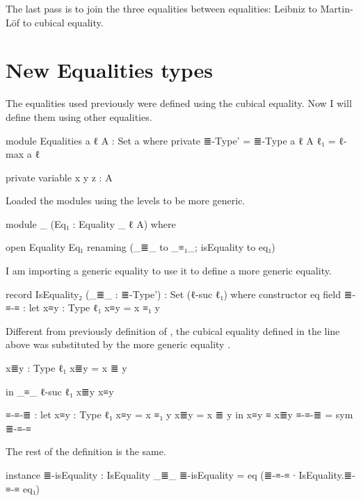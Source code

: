 \documentclass{article}
\begin{document}
The last pass is to join the three equalities between equalities:
Leibniz to Martin-Löf to cubical equality.

\section{New Equalities types}

The equalities used previously were defined using the cubical equality.
Now I will define them using other equalities.

\begin{code}
module Equalities {a ℓ} {A : Set a} where
  private
    ≣-Type' = ≣-Type {a} {ℓ} {A}
    ℓ₁ = ℓ-max a ℓ

  private variable
    x y z : A
\end{code}

Loaded the modules using the levels to be more generic.

\begin{code}
  module _
    (Eq₁ : Equality {_} {ℓ} {A})
    where

    open Equality Eq₁ renaming (_≣_ to _≡₁_; isEquality to eq₁)
\end{code}

I am importing a generic equality to use it to define a more generic equality.

\begin{code}
    record IsEquality₂ (_≣_ : ≣-Type') : Set (ℓ-suc ℓ₁) where
      constructor eq
      field
        ≣-≡-≡ : let
          x≡y : Type ℓ₁
          x≡y = x ≡₁ y
\end{code}

Different from previously definition of ,
the cubical equality defined in the line above was substituted by
the more generic equality .

\begin{code}
          x≣y : Type ℓ₁
          x≣y = x ≣ y

          in _≡_ {ℓ-suc ℓ₁} x≣y x≡y

      ≡-≡-≣ : let
        x≡y : Type ℓ₁
        x≡y = x ≡₁ y
        x≣y = x ≣ y
        in x≡y ≡ x≣y
      ≡-≡-≣ = sym ≣-≡-≡

\end{code}

The rest of the definition is the same.

\begin{code}
      instance
        ≣-isEquality : IsEquality _≣_
        ≣-isEquality = eq (≣-≡-≡ ∙ IsEquality.≣-≡-≡ eq₁)
\end{code}
\end{document}
